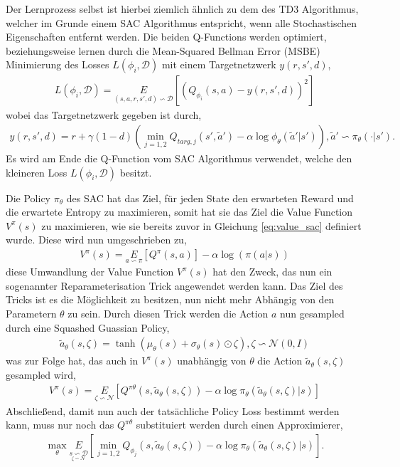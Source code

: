 \documentclass[]{iat}
\begin{document}
Der Lernprozess selbst ist hierbei ziemlich ähnlich zu dem des TD3 Algorithmus, welcher im Grunde einem SAC Algorithmus entspricht, wenn alle Stochastischen Eigenschaften entfernt werden. Die beiden Q-Functions werden optimiert, beziehungsweise lernen durch die Mean-Squared Bellman Error (MSBE) Minimierung des Losses $L(\phi_i, \mathcal{D})$ mit einem Targetnetzwerk $y(r, s', d)$,
\begin{align}
    L(\phi_i, \mathcal{D}) = \underset{(s, a, r, s', d) \backsim \mathcal{D}}{E}\left[\left(Q_{\phi_i}(s,a) - y(r, s', d)\right)^2 \right]
\end{align}
wobei das Targetnetzwerk gegeben ist durch,
\begin{align}
    y(r,s', d) = r+\gamma(1-d)\left(\min_{j=1,2}Q_{targ,j}(s', \widetilde{a}')-\alpha \log \phi_{\theta}(\widetilde{a}' | s')\right), \widetilde{a}'\backsim \pi_{\theta}(\cdot |s').
\end{align} \label{eq:target}
Es wird am Ende die Q-Function vom SAC Algorithmus verwendet, welche den kleineren Loss $L(\phi_i, \mathcal{D})$ besitzt.

Die Policy $\pi_{\theta}$ des SAC hat das Ziel, für jeden State den erwarteten Reward und die erwartete Entropy zu maximieren, somit hat sie das Ziel die Value Function $V^{\pi}(s)$ zu maximieren, wie sie bereits zuvor in Gleichung \ref{eq:value_sac} definiert wurde. Diese wird nun umgeschrieben zu,
\begin{align}
    V^{\pi}(s) = \underset{a \backsim \pi}{E} \left[Q^{\pi}(s, a)\right] - \alpha \log(\pi(a | s)) \label{eq:value_sac2}
\end{align}
diese Umwandlung der Value Function $V^{\pi}(s)$ hat den Zweck, das nun ein sogenannter Reparameterisation Trick angewendet werden kann. Das Ziel des Tricks ist es die Möglichkeit zu besitzen, nun nicht mehr Abhängig von den Parametern $\theta$ zu sein. Durch diesen Trick werden die Action $a$ nun gesampled durch eine Squashed Guassian Policy,
\begin{align}
    \widetilde{a}_\theta(s, \zeta) = \tanh(\mu_\theta(s) + \sigma_\theta(s) \odot \zeta), \zeta \backsim \mathcal{N} (0, I) \label{eq:reparamtrick}
\end{align}
was zur Folge hat, das auch in $V^{\pi}(s)$ unabhängig von $\theta$ die Action $\widetilde{a}_\theta(s, \zeta)$ gesampled wird,
\begin{align}
    V^{\pi}(s) = \underset{\zeta \backsim \mathcal{N} }{E} \left[Q^{\pi\theta}(s, \widetilde{a}_\theta(s, \zeta)) - \alpha \log\pi_\theta(\widetilde{a}_\theta(s, \zeta) | s)\right]
\end{align}
Abschließend, damit nun auch der tatsächliche Policy Loss bestimmt werden kann, muss nur noch das $Q^{\pi\theta}$ substituiert werden durch einen Approximierer,
\begin{align}
    \max_\theta \underset{\underset{\zeta \backsim \mathcal{N} }{s \backsim \mathcal{D} }}{E} \left[\min_{j=1,2}Q_{\phi_j}(s,\widetilde{a}_\theta(s, \zeta)) - \alpha \log \pi_\theta(\widetilde{a}_\theta(s, \zeta)|s)\right].
\end{align}
\cite[]{sacv2} \cite[]{brockman2016openai}
\end{document}
